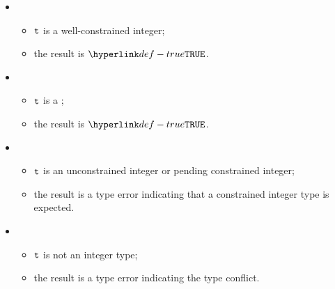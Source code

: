 \ProseParagraph
\OneApplies
\begin{itemize}
  \item {}
  \begin{itemize}
    \item $\texttt{t}$ is a well-constrained integer;
    \item the result is $\True$.
  \end{itemize}

  \item {}
  \begin{itemize}
    \item $\texttt{t}$ is a \parameterizedintegertype;
    \item the result is $\True$.
  \end{itemize}

  \item {}
  \begin{itemize}
    \item $\texttt{t}$ is an unconstrained integer or pending constrained integer;
    \item the result is a type error indicating that a constrained integer type is expected.
  \end{itemize}

  \item {}
  \begin{itemize}
    \item $\texttt{t}$ is not an integer type;
    \item the result is a type error indicating the type conflict.
  \end{itemize}
\end{itemize}

\FormallyParagraph
{}
